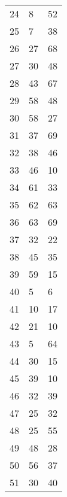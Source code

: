 \begin{longtable}[c]{ p{} p{} p{} }
			24          & 8             & 52           \\
			25          & 7             & 38           \\
			26          & 27            & 68           \\
			27          & 30            & 48           \\
			28          & 43            & 67           \\
			29          & 58            & 48           \\
			30          & 58            & 27           \\
			31          & 37            & 69           \\
			32          & 38            & 46           \\
			33          & 46            & 10           \\
			34          & 61            & 33           \\
			35          & 62            & 63           \\
			36          & 63            & 69           \\
			37          & 32            & 22           \\
			38          & 45            & 35           \\
			39          & 59            & 15           \\
			40          & 5             & 6            \\
			41          & 10            & 17           \\
			42          & 21            & 10           \\
			43          & 5             & 64           \\
			44          & 30            & 15           \\
			45          & 39            & 10           \\
			46          & 32            & 39           \\
			47          & 25            & 32           \\
			48          & 25            & 55           \\
			49          & 48            & 28           \\
			50          & 56            & 37           \\
			51          & 30            & 40          \\
\end{longtable}
\pagebreak


